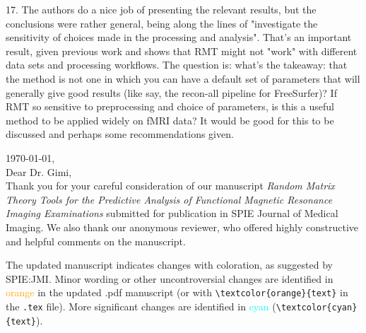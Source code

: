 \documentclass[10pt,letter]{article}
\begin{document}
{%





17. The authors do a nice job of presenting the relevant results, but the
conclusions were rather general, being along the lines of "investigate the
sensitivity of choices made in the processing and analysis". That's an
important result, given previous work and shows that RMT might not "work" with
different data sets and processing workflows. The question is: what's the
takeaway: that the method is not one in which you can have a default set of
parameters that will generally give good results (like say, the recon-all
pipeline for FreeSurfer)? If RMT so sensitive to preprocessing and choice of
parameters, is this a useful method to be applied widely on fMRI data? It would
be good for this to be discussed and perhaps some recommendations given.
}

\noindent
\today, \\
Dear Dr. Gimi, \\

Thank you for your careful consideration of our manuscript
\emph{Random Matrix Theory Tools for the Predictive Analysis of Functional
Magnetic Resonance Imaging Examinations} submitted for publication in SPIE
Journal of Medical Imaging. We also thank our anonymous reviewer,
who offered highly constructive and helpful comments on the manuscript.

The updated manuscript indicates changes with coloration, as suggested by
SPIE:JMI. Minor wording or other uncontroversial changes are identified in
\textcolor{orange}{orange} in the updated .pdf manuscript (or with
\verb|\textcolor{orange}{text}| in the \texttt{.tex} file). More significant
changes are identified in \textcolor{cyan}{cyan} (\verb|\textcolor{cyan}{text}|).
\end{document}
